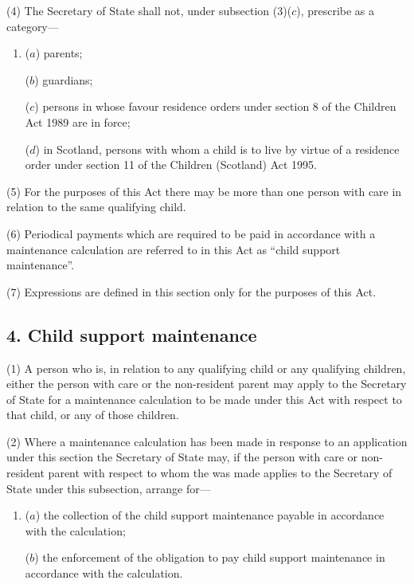 \documentclass[12pt,a4paper]{article}
\begin{document}
(4)
The Secretary of State shall not, under subsection (3)($c$), prescribe as a
category---
\begin{enumerate}\item[]
($a$)
parents;

($b$)
guardians;

($c$)
persons in whose favour residence orders under section 8 of the Children
Act 1989
 are in force;

($d$)
in Scotland, persons 
with whom a child is to live by virtue of a residence order under section 11 of the Children (Scotland) Act 1995.
\end{enumerate}

(5)
For the purposes of this Act there may be more than one person with care
in relation to the same qualifying child.

(6)
Periodical payments which are required to be paid in accordance with a maintenance calculation
are referred to in this Act as “child
support maintenance”.

(7)
Expressions are defined in this section only for the purposes of this Act.


\subsection{4. Child support maintenance}

(1) A
person who is, in relation to any qualifying child or any qualifying
children, either the person with care or the non-resident parent
may
apply to the Secretary of State for a maintenance calculation
to be made under this Act with respect to that child, or any of those
children.

(2)
Where a maintenance calculation
has been made in
response to an application under this section the Secretary of State may, if the
person with care or non-resident parent
with respect to whom the
was made applies to the Secretary of State under this
subsection, arrange for---
\begin{enumerate}\item[]
($a$)
the collection of the child support maintenance payable in accordance
with the calculation;

($b$)
the enforcement of the obligation to pay child support maintenance in
accordance with the calculation.

\end{enumerate}
\end{document}
